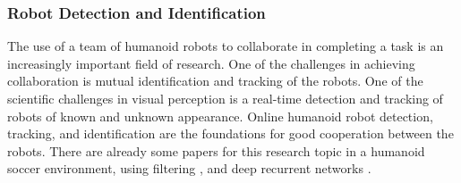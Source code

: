 \documentclass{article}
\begin{document}


\subsubsection{Robot Detection and Identification}
The use of a team of humanoid robots to collaborate in completing a task is an increasingly important field of research. 
One of the challenges in achieving collaboration is mutual identification and tracking of the robots. One of the scientific challenges in visual perception is a real-time detection and tracking of robots of known and unknown appearance.
Online humanoid robot detection, tracking, and identification are the foundations for good cooperation between the robots. 
There are already some papers for this research topic in a humanoid soccer environment, using filtering \cite{farazi2016real}, and deep recurrent networks \cite{farazi2017online}.
\end{document}
